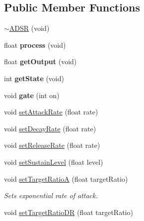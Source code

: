 \subsection*{Public Member Functions}
\begin{DoxyCompactItemize}
\item 
\hyperlink{class_a_d_s_r_aadf84fe41cff1b78edd9a7080e1f7ad7}{$\sim$\+A\+D\+SR} (void)
\item 
float {\bfseries process} (void)\hypertarget{class_a_d_s_r_a2c4f8e14a8022f553fd903335b2aa4dd}{}\label{class_a_d_s_r_a2c4f8e14a8022f553fd903335b2aa4dd}

\item 
float {\bfseries get\+Output} (void)\hypertarget{class_a_d_s_r_ad3ee946178d0d23f83e94bf95ce98c96}{}\label{class_a_d_s_r_ad3ee946178d0d23f83e94bf95ce98c96}

\item 
int {\bfseries get\+State} (void)\hypertarget{class_a_d_s_r_a69eecf53c32127aaf472afc0e897cc07}{}\label{class_a_d_s_r_a69eecf53c32127aaf472afc0e897cc07}

\item 
void {\bfseries gate} (int on)\hypertarget{class_a_d_s_r_a8519d1faff0ff2b26e44675249093872}{}\label{class_a_d_s_r_a8519d1faff0ff2b26e44675249093872}

\item 
void \hyperlink{class_a_d_s_r_adf710a6ecb0980dd26a7b6ab0ead5127}{set\+Attack\+Rate} (float rate)
\item 
void \hyperlink{class_a_d_s_r_acdbd41bc66f06ab17abb171a335fc180}{set\+Decay\+Rate} (float rate)
\item 
void \hyperlink{class_a_d_s_r_a9f98384da4c14db473e4751f625e0e66}{set\+Release\+Rate} (float rate)
\item 
void \hyperlink{class_a_d_s_r_af9f4efe95e72ee6c0066a0249794f367}{set\+Sustain\+Level} (float level)
\item 
void \hyperlink{class_a_d_s_r_aad95d6ef2b3e685a31ae243ccf91ec42}{set\+Target\+RatioA} (float target\+Ratio)\hypertarget{class_a_d_s_r_aad95d6ef2b3e685a31ae243ccf91ec42}{}\label{class_a_d_s_r_aad95d6ef2b3e685a31ae243ccf91ec42}

\begin{DoxyCompactList}\small\item\em Sets exponential rate of attack. \end{DoxyCompactList}\item 
void \hyperlink{class_a_d_s_r_ad7aafc0414359f08863eeb49970474e3}{set\+Target\+Ratio\+DR} (float target\+Ratio)\hypertarget{class_a_d_s_r_ad7aafc0414359f08863eeb49970474e3}{}\label{class_a_d_s_r_ad7aafc0414359f08863eeb49970474e3}


\end{DoxyCompactItemize}
